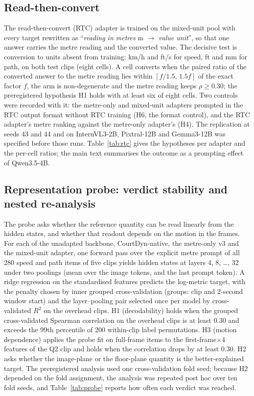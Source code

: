 \documentclass[11pt]{article}
\begin{document}
\subsection{Read-then-convert}
\label{supp:rtc}

The read-then-convert (RTC) adapter is trained on the mixed-unit pool with
every target rewritten as ``\emph{reading in metres} m $\rightarrow$
\emph{value unit}'', so that one answer carries the metre reading and the
converted value. The decisive test is conversion to units absent from
training: km/h and ft/s for speed, ft and mm for path, on both test clips
(eight cells). A cell converts when the paired ratio of the converted answer
to the metre reading lies within $[f/1.5,\,1.5f]$ of the exact factor $f$,
the arm is non-degenerate and the metre reading keeps $\rho\ge0.30$; the
preregistered hypothesis H1 holds with at least six of eight cells. Two
controls were recorded with it: the metre-only and mixed-unit adapters
prompted in the RTC output format without RTC training (H6, the format
control), and the RTC adapter's metre ranking against the metre-only
adapter's (H4). The replication at seeds 43 and 44 and on InternVL3-2B,
Pixtral-12B and Gemma3-12B was specified before those runs.
Table~\ref{tab:rtc} gives the hypotheses per adapter and the per-cell
ratios; the main text summarises the outcome as a prompting effect of
Qwen3.5-4B.



\subsection{Representation probe: verdict stability and nested re-analysis}
\label{supp:probe}

The probe asks whether the reference quantity can be read linearly from the
hidden states, and whether that readout depends on the motion in the frames.
For each of the unadapted backbone, CourtDyn-native, the metre-only v3 and
the mixed-unit adapter, one forward pass over the explicit metre prompt of
all 280 speed and path items of five clips yields hidden states at layers 4,
8, \ldots, 32 under two poolings (mean over the image tokens, and the last
prompt token). A ridge regression on the standardised features predicts the
log-metric target, with the penalty chosen by inner grouped cross-validation
(groups: clip and 2-second window start) and the layer--pooling pair selected
once per model by cross-validated $R^2$ on the overhead clips. H1
(decodability) holds when the grouped cross-validated Spearman correlation on
the overhead clips is at least $0.30$ and exceeds the 99th percentile of 200
within-clip label permutations. H3 (motion dependence) applies the probe fit
on full-frame items to the first-frame$\times4$ features of the Q2 clip and
holds when the correlation drops by at least $0.30$. H2 asks whether the
image-plane or the floor-plane quantity is the better-explained target. The
preregistered analysis used one cross-validation fold seed; because H2
depended on the fold assignment, the analysis was repeated post hoc over ten
fold seeds, and Table~\ref{tab:probe} reports how often each verdict was
reached.
\end{document}
